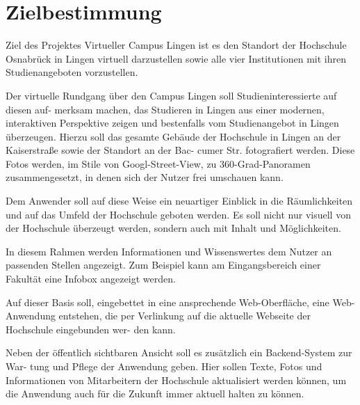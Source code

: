 \section{Zielbestimmung}
\label{sec:Zielbestimmung}

Ziel des Projektes Virtueller Campus Lingen ist es den Standort der Hochschule Osnabrück
in Lingen virtuell darzustellen sowie alle vier Institutionen mit ihren Studienangeboten
vorzustellen.

Der virtuelle Rundgang über den Campus Lingen soll Studieninteressierte auf diesen auf-
merksam machen, das Studieren in Lingen aus einer modernen, interaktiven Perspektive
zeigen und bestenfalls vom Studienangebot in Lingen überzeugen. Hierzu soll das gesamte
Gebäude der Hochschule in Lingen an der Kaiserstraße sowie der Standort an der Bac-
cumer Str. fotografiert werden. Diese Fotos werden, im Stile von Googl-Street-View, zu
360-Grad-Panoramen zusammengesetzt, in denen sich der Nutzer frei umschauen kann.

Dem Anwender soll auf diese Weise ein neuartiger Einblick in die Räumlichkeiten und auf
das Umfeld der Hochschule geboten werden. Es soll nicht nur visuell von der Hochschule
überzeugt werden, sondern auch mit Inhalt und Möglichkeiten.

In diesem Rahmen werden Informationen und Wissenswertes dem Nutzer an passenden
Stellen angezeigt. Zum Beispiel kann am Eingangsbereich einer Fakultät eine Infobox
angezeigt werden.

Auf dieser Basis soll, eingebettet in eine ansprechende Web-Oberfläche, eine Web-Anwendung
entstehen, die per Verlinkung auf die aktuelle Webseite der Hochschule eingebunden wer-
den kann.

Neben der öffentlich sichtbaren Ansicht soll es zusätzlich ein Backend-System zur War-
tung und Pflege der Anwendung geben. Hier sollen Texte, Fotos und Informationen von
Mitarbeitern der Hochschule aktualisiert werden können, um die Anwendung auch für die
Zukunft immer aktuell halten zu können.
